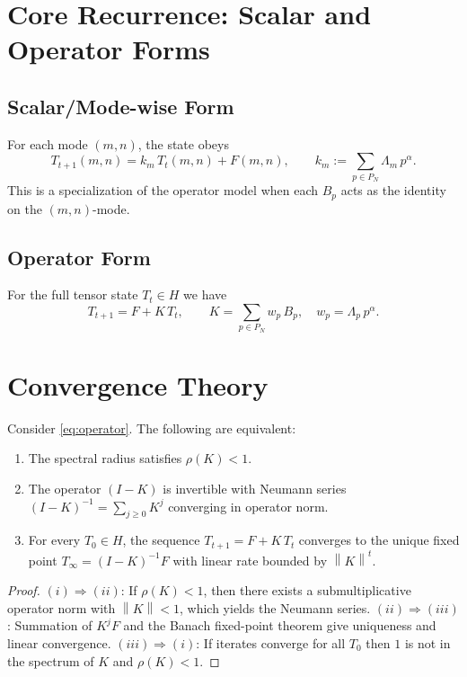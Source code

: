 \documentclass[11pt]{article}
\theoremstyle{definition}
\theoremstyle{remark}
\newcommand{\norm}[1]{\left\lVert #1\right\rVert}
\newcommand{\1}{\mathbf{1}}
\begin{document}
\section{Core Recurrence: Scalar and Operator Forms}
\subsection{Scalar/Mode-wise Form}
For each mode $(m,n)$, the state obeys
\begin{equation}
  T_{t+1}(m,n) = k_m\,T_t(m,n) + F(m,n), \qquad k_m := \sum_{p\in P_N} \Lambda_m\, p^{\alpha}.
  \label{eq:scalar}
\end{equation}
This is a specialization of the operator model when each $B_p$ acts as the identity on the $(m,n)$-mode.

\subsection{Operator Form}
For the full tensor state $T_t\in H$ we have
\begin{equation}
  T_{t+1} = F + K\,T_t, \qquad K = \sum_{p\in P_N} w_p\,B_p, \quad w_p=\Lambda_p\,p^{\alpha}.
  \label{eq:operator}
\end{equation}

\section{Convergence Theory}
\begin{theorem}
Consider \eqref{eq:operator}. The following are equivalent:
\begin{enumerate}[label=(\roman*),leftmargin=*]
  \item The spectral radius satisfies $\rho(K)<1$.
  \item The operator $(I-K)$ is invertible with Neumann series $(I-K)^{-1}=\sum_{j\ge 0} K^j$ converging in operator norm.
  \item For every $T_0\in H$, the sequence $T_{t+1}=F+K\,T_t$ converges to the unique fixed point $T_\infty=(I-K)^{-1}F$ with linear rate bounded by $\norm{K}^t$.
\end{enumerate}
\end{theorem}
\begin{proof}
$(i)\Rightarrow(ii)$: If $\rho(K)<1$, then there exists a submultiplicative operator norm with $\norm{K}<1$, which yields the Neumann series. $(ii)\Rightarrow(iii)$: Summation of $K^jF$ and the Banach fixed-point theorem give uniqueness and linear convergence. $(iii)\Rightarrow(i)$: If iterates converge for all $T_0$ then $1$ is not in the spectrum of $K$ and $\rho(K)<1$.
\end{proof}
\end{document}
